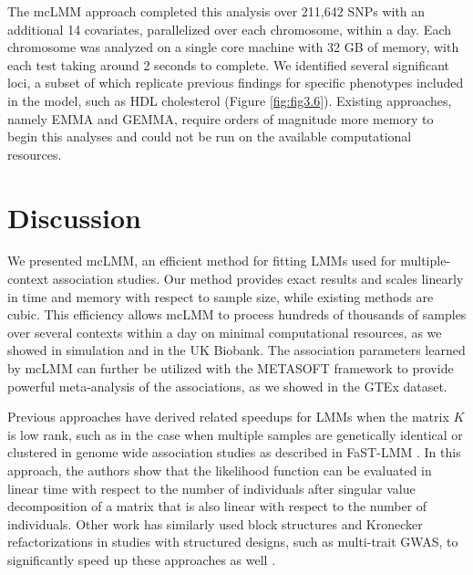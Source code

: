         The mcLMM approach completed this analysis over 211,642 SNPs with an additional 14 covariates, parallelized over each chromosome, within a day. Each chromosome was analyzed on a single core machine with 32 GB of memory, with each test taking around 2 seconds to complete. We identified several significant loci, a subset of which replicate previous findings for specific phenotypes included in the model, such as HDL cholesterol \cite{Wojcik} (Figure \ref{fig:fig3.6}). Existing approaches, namely EMMA and GEMMA, require orders of magnitude more memory to begin this analyses and could not be run on the available computational resources.
    
        
    \section{Discussion}

    We presented mcLMM, an efficient method for fitting LMMs used for multiple-context association studies. Our method provides exact results and scales linearly in time and memory with respect to sample size, while existing methods are cubic. This efficiency allows mcLMM to process hundreds of thousands of samples over several contexts within a day on minimal computational resources, as we showed in simulation and in the UK Biobank. The association parameters learned by mcLMM can further be utilized with the METASOFT framework to provide powerful meta-analysis of the associations, as we showed in the GTEx dataset. 
    
    Previous approaches have derived related speedups for LMMs when the matrix $K$ is low rank, such as in the case when multiple samples are genetically identical or clustered in genome wide association studies as described in FaST-LMM \cite{Lippert2011}. In this approach, the authors show that the likelihood function can be evaluated in linear time with respect to the number of individuals after singular value decomposition of a matrix that is also linear with respect to the number of individuals. Other work has similarly used block structures and Kronecker refactorizations in studies with structured designs, such as multi-trait GWAS, to significantly speed up these approaches as well \cite{Korte2012, Rakitsch2013}.

